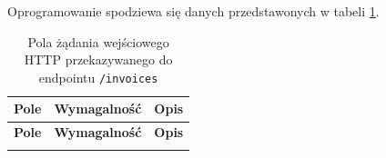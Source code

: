 \noindent Oprogramowanie spodziewa się danych przedstawonych w tabeli \ref{tab:invoice_input_fields}.
\begin{small}
\begin{longtable}{>{\raggedright\arraybackslash}p{3.8cm} >{\raggedright\arraybackslash}p{2.6cm} >{\raggedright\arraybackslash}p{6.6cm}}
\caption{Pola żądania wejściowego HTTP przekazywanego do endpointu \texttt{/invoices}}
\label{tab:invoice_input_fields} \\
\toprule
\textbf{Pole} & \textbf{Wymagalność} & \textbf{Opis} \\
\midrule
\endfirsthead

\toprule
\textbf{Pole} & \textbf{Wymagalność} & \textbf{Opis} \\
\midrule
\endhead

\bottomrule
\endfoot


\end{longtable}
\end{small}
